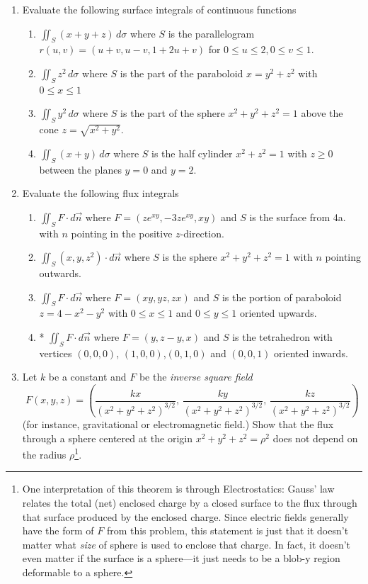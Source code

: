 \documentclass[12pt]{article}
\numberwithin{equation}{subsection}
\numberwithin{figure}{subsection}
\theoremstyle{note}
\begin{document}
{\begin{enumerate}[label=\arabic*.]
\item Evaluate the following surface integrals of continuous functions

\begin{enumerate}
	\item $\displaystyle \iint_{S} (x+y+z)\,d\sigma$ where $S$ is the parallelogram $r(u,v)=(u+v, u-v, 1+2u+v)$ for $0\leq u\leq 2, 0\leq v\leq 1$.
	\item $\displaystyle \iint_{S} z^2 \,d\sigma$ where $S$ is the part of the paraboloid $x=y^2+z^2$ with $0\leq x\leq 1$
	\item $\displaystyle \iint_{S} y^2\,d\sigma$ where $S$ is the part of the sphere $x^2+y^2+z^2=1$ above the cone $z=\sqrt{x^2+y^2}$.
	\item $\displaystyle \iint_{S} (x+y)\,d\sigma$ where $S$ is the half cylinder $x^2+z^2=1$ with $z\geq 0$ between the planes $y=0$ and $y=2$. 
\end{enumerate}

\item Evaluate the following flux integrals 
\begin{enumerate}
	\item $\displaystyle \iint_{S} F\cdot d\vec{n}$ where $F=(ze^{xy}, -3ze^{xy}, xy)$ and $S$ is the surface from 4a. with $n$ pointing in the positive $z$-direction. 
	\item $\displaystyle \iint_{S} (x,y,z^2)\cdot d\vec{n}$ where $S$ is the sphere $x^2+y^2+z^2=1$ with $n$ pointing outwards.
	\item $\displaystyle \iint_{S} F\cdot d\vec{n}$ where $F=(xy, yz, zx)$ and $S$ is the portion of paraboloid $z=4-x^2-y^2$ with $0\leq x\leq 1$ and $0\leq y\leq 1$ oriented upwards.
	\item* $\displaystyle \iint_{S} F\cdot d\vec{n}$ where $F=(y,z-y,x)$ and $S$ is the tetrahedron with vertices $(0,0,0)$, $(1,0,0)$,$(0,1,0)$ and $(0,0,1)$ oriented inwards.
\end{enumerate}

\item Let $k$ be a constant and $F$ be the \textit{inverse square field} \[ F(x,y,z)=\left( \dfrac{kx}{(x^2+y^2+z^2)^{3/2}}, \,\dfrac{ky}{(x^2+y^2+z^2)^{3/2}} , \,\dfrac{kz}{(x^2+y^2+z^2)^{3/2}} \right) \] (for instance, gravitational or electromagnetic field.) Show that the flux through a sphere centered at the origin $x^2+y^2+z^2=\rho^2$ does not depend on the radius $\rho$\footnote{One interpretation of this theorem is through Electrostatics: Gauss' law relates the total (net) enclosed charge by a closed surface to the flux through that surface produced by the enclosed charge. Since electric fields generally have the form of $F$ from this problem, this statement is just that it doesn't matter what \textit{size} of sphere is used to enclose that charge. In fact, it doesn't even matter if the surface is a sphere---it just needs to be a blob-y region deformable to a sphere.}. 


\end{enumerate}}
\end{document}
